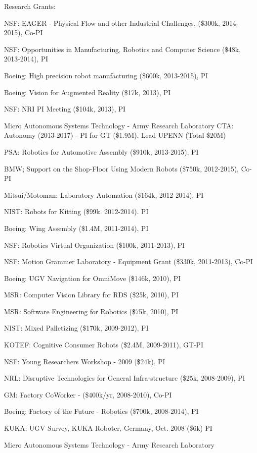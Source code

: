 \documentclass{article}
\begin{document}
\begin{cv}
\begin{cvlist}{Research Grants:}
\item NSF: EAGER - Physical Flow and other Industrial Challenges,
  (\$300k, 2014-2015), Co-PI
\item NSF: Opportunities in Manufacturing, Robotics and Computer Science
  (\$48k, 2013-2014), PI
\item Boeing: High precision robot manufacturing (\$600k, 2013-2015), PI
\item Boeing: Vision for Augmented Reality (\$17k, 2013), PI
\item NSF: NRI PI Meeting (\$104k, 2013), PI
\item Micro Autonomous Systems Technology - Army Research Laboratory
  CTA: Autonomy (2013-2017) - PI for GT (\$1.9M). Lead UPENN (Total
  \$20M) %
\item PSA: Robotics for Automotive Assembly (\$910k, 2013-2015), PI
\item BMW; Support on the Shop-Floor Using Modern Robots (\$750k,
  2012-2015), Co-PI
\item Mitsui/Motoman: Laboratory Automation (\$164k, 2012-2014), PI
\item NIST: Robots for Kitting (\$99k. 2012-2014). PI
\item Boeing: Wing Assembly (\$1.4M, 2011-2014), PI
\item NSF: Robotics Virtual Organization (\$100k, 2011-2013), PI
\item NSF: Motion Grammer Laboratory - Equipment Grant (\$330k, 2011-2013), Co-PI
\item Boeing: UGV Navigation for OmniMove (\$146k, 2010), PI
\item MSR: Computer Vision Library for RDS (\$25k, 2010), PI
\item MSR: Software Engineering for Robotics (\$75k, 2010), PI
\item NIST: Mixed Palletizing (\$170k, 2009-2012), PI
\item KOTEF: Cognitive Consumer Robots (\$2.4M, 2009-2011), GT-PI
\item NSF: Young Researchers Workshop - 2009 (\$24k), PI
\item NRL: Disruptive Technologies for General Infra-structure  (\$25k, 2008-2009), PI
\item GM: Factory CoWorker - (\$400k/yr, 2008-2010), Co-PI
\item Boeing: Factory of the Future - Robotics (\$700k, 2008-2014), PI
\item KUKA: UGV Survey, KUKA Roboter, Germany, Oct. 2008 (\$6k)  PI%
\item Micro Autonomous Systems Technology - Army Research Laboratory

\end{cvlist}
\end{cv}
\end{document}
